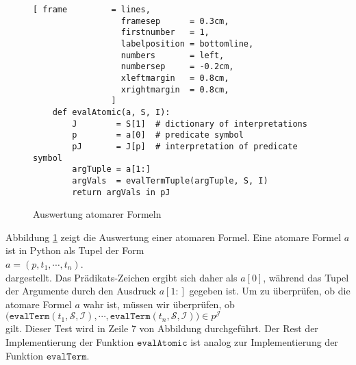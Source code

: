 \begin{figure}[!ht]
\centering
\begin{Verbatim}[ frame         = lines, 
                  framesep      = 0.3cm, 
                  firstnumber   = 1,
                  labelposition = bottomline,
                  numbers       = left,
                  numbersep     = -0.2cm,
                  xleftmargin   = 0.8cm,
                  xrightmargin  = 0.8cm,
                ]
    def evalAtomic(a, S, I):
        J        = S[1]  # dictionary of interpretations
        p        = a[0]  # predicate symbol
        pJ       = J[p]  # interpretation of predicate symbol
        argTuple = a[1:]
        argVals  = evalTermTuple(argTuple, S, I)
        return argVals in pJ
\end{Verbatim}
\vspace*{-0.3cm}
\caption{Auswertung atomarer Formeln}
\label{fig:evalAtomic.ipynb}
\end{figure}

Abbildung \ref{fig:evalAtomic.ipynb} zeigt die Auswertung einer atomaren Formel.  Eine atomare Formel $a$ 
ist in Python als Tupel der Form
\\[0.2cm]
\hspace*{1.3cm}
$a = (p, t_1,\cdots,t_n)$.
\\[0.2cm]
dargestellt.  Das Prädikats-Zeichen ergibt sich daher als $a[0]$, während das Tupel der Argumente durch den
Ausdruck $a[1:]$ gegeben ist.  Um zu überprüfen, ob die atomare Formel $a$ wahr ist, müssen wir überprüfen, ob
\\[0.2cm]
\hspace*{1.3cm}
$\bigl(\texttt{evalTerm}(t_1,\mathcal{S}, \mathcal{I}), \cdots, \texttt{evalTerm}(t_n,\mathcal{S},\mathcal{I})\bigr)\in p^\mathcal{J}$
\\[0.2cm]
gilt.  Dieser Test wird in Zeile 7 von Abbildung durchgeführt. Der Rest der Implementierung der Funktion
$\texttt{evalAtomic}$ ist analog zur Implementierung der Funktion $\texttt{evalTerm}$.


